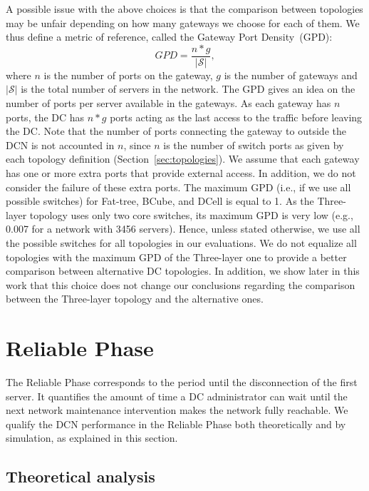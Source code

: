 A possible issue with the above choices is that the comparison between topologies may be unfair depending on how many gateways we choose for each of them. We thus define a metric of reference, called the Gateway Port Density~(GPD):
\begin{equation}
GPD = \frac{n*g}{|\mathcal{S}|},
\label{eq:epd}
\end{equation}
where $n$ is the number of ports on the gateway, $g$ is the number of gateways and $|\mathcal{S}|$ is the total number of servers in the network.
The GPD gives an idea on the number of ports per server available in the gateways. As each gateway has $n$ ports, the DC has $n*g$ ports acting as the last access to the traffic before leaving the DC. Note that the number of ports connecting the gateway to outside the DCN is not accounted in $n$, since $n$ is the number of switch ports as given by each topology definition (Section~\ref{sec:topologies}). We assume that each gateway has one or more extra ports that provide external access. In addition, we do not consider the failure of these extra ports.
The maximum GPD (i.e., if we use all possible switches) for Fat-tree, BCube, and DCell is equal to 1. 
As the Three-layer topology uses only two core switches, its maximum GPD is very low (e.g., 0.007 for a network with 3456 servers).
Hence, unless stated otherwise, we use all the possible switches for all topologies in our evaluations.
We do not equalize all topologies with the maximum GPD of the Three-layer one to provide a better comparison between alternative DC topologies.
In addition, we show later in this work that this choice does not change our conclusions regarding the comparison between the Three-layer topology and the alternative ones.

\section{Reliable Phase}
\label{sec:reliableTime} 

The Reliable Phase corresponds to the period until the disconnection of the first server. It quantifies the amount of time a DC administrator can wait until the next network maintenance intervention makes the network fully reachable. We qualify the DCN performance in the Reliable Phase both theoretically and by simulation, as explained in this section.

\subsection{Theoretical analysis}


